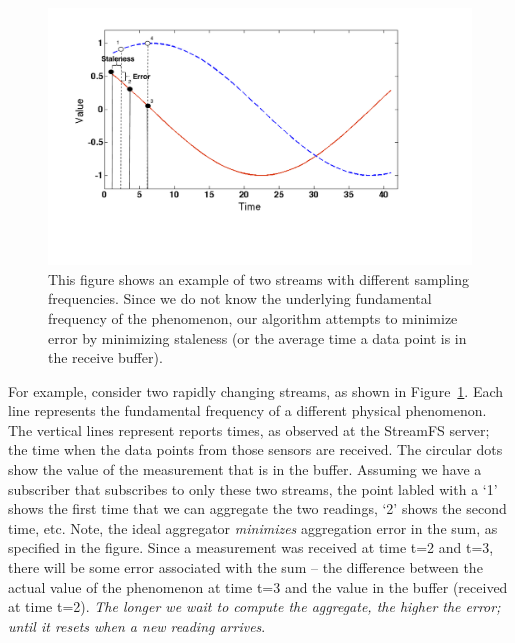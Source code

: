 \begin{figure}[t!] %
\centering
\includegraphics[width=0.75\columnwidth]{figs/sched_example.pdf}
\caption{This figure shows an example of two streams with different sampling frequencies.  Since we do not know the underlying fundamental frequency
of the phenomenon, our algorithm attempts to minimize error by minimizing staleness (or the average time a data point is in the receive buffer).}
\label{fig:sched_example}
\end{figure}

For example, consider two rapidly changing streams, as shown in Figure~\ref{fig:sched_example}.  
Each line represents the fundamental frequency of a different physical phenomenon.  The vertical lines represent reports times, as
observed at the StreamFS server; the time when the data points from those sensors are received.  
The circular dots show the value of the 
measurement that is in the buffer.  Assuming we have a subscriber that subscribes to only these two streams, the point labled with a 
`1' shows the first time that we can aggregate the two readings, `2' shows the second time, etc.
Note, the ideal aggregator \emph{minimizes} aggregation error in the sum, as specified in the figure.  Since a measurement was received 
at time t=2 and t=3, there will be some error associated with the sum -- the difference between the actual
value of the phenomenon at time t=3 and the value in the buffer (received at time t=2).  \emph{The longer we wait to compute the 
aggregate, the higher the error; until it resets when a new reading arrives}.

